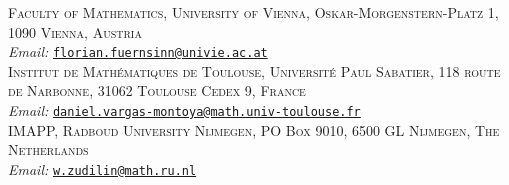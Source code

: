 \documentclass{article}
\theoremstyle{definition}
\theoremstyle{plain}
\theoremstyle{remark}
\begin{document}
\textsc{Faculty of Mathematics, University of Vienna, Oskar-Morgenstern-Platz 1, 1090 Vienna, Austria}\\
\textit{Email: }\href{mailto:florian.fuernsinn@univie.ac.at}{\texttt{florian.fuernsinn@univie.ac.at}}\\

\textsc{Institut de Mathématiques de Toulouse, Université Paul Sabatier, 118 route de Narbonne, 31062 Toulouse Cedex 9, France
}\\
\textit{Email: }\href{mailto:daniel.vargas-montoya@math.univ-toulouse.fr}{\texttt{daniel.vargas-montoya@math.univ-toulouse.fr}}\\

\textsc{IMAPP, Radboud University Nijmegen, PO Box 9010, 6500 GL Nijmegen, The Netherlands}\\
\textit{Email: }\href{mailto:w.zudilin@math.ru.nl}{\texttt{w.zudilin@math.ru.nl}}\\
\end{document}

